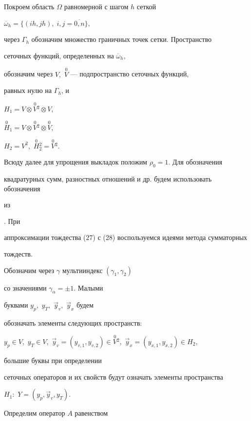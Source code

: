  


Покроем область $\Omega$ равномерной с шагом $h$ сеткой 


$\overline\omega_h=\{(ih,jh),\;i,j=\overline{0,n}\},$ 


через $\Gamma_h$ обозначим множество граничных точек сетки. Пространство 


сеточных функций, определенных на $\overline\omega_h,$


обозначим через $V,$ $\overset{0} V$ --- подпространство сеточных функций, 


равных нулю на $\Gamma_h$, и  


$H_1=V\otimes \overset{0} V{}^2\otimes V,$ 


$\overset{0} H{}_1=V\otimes\overset{0} V{}^2\otimes\overset{0} V,$ 


$H_2=V^2,$ $\overset{0} H{}^2_2=\overset{0} V{}^2.$ 


 


Всюду далее для упрощения выкладок положим $\rho_0=1.$ Для обозначения 


квадратурных сумм, разностных отношений и др. будем использовать обозначения 


из 


\cite{Kar}. При 


аппроксимации тождества (27) с (28) воспользуемся идеями метода сумматорных 


тождеств. 


 


Обозначим через $\gamma$ мультииндекс $(\gamma_1,\gamma_2)$ 


со значениями $\gamma_\alpha=\pm 1.$ Малыми 


буквами $y_p,$ $y_T,$ $\Vec y_v,$ $\Vec y_x$ будем 


обозначать элементы следующих пространств:


$y_p\in V,$ $y_T\in V,$ $\Vec y_v=(y_{v,1},y_{v,2})\in 


\overset{0} V{}^2,$ $\Vec y_x=(y_{x,1},y_{x,2})\in H_2,$ 


большие буквы при определении 


сеточных операторов и их свойств будут означать элементы пространства 


$H_1:$ $Y=(y_p,\Vec y_v,y_T).$ 


 


Определим оператор $A$ равенством 


